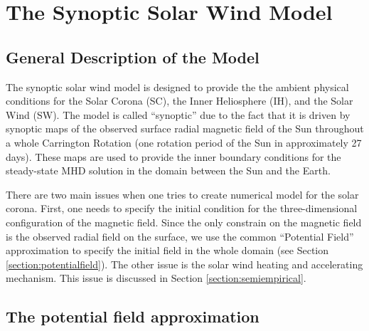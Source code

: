 \chapter{The Synoptic Solar Wind Model \label{chapter:synopticSW}}

\section{General Description of the Model \label{section:SWmodel}}
The synoptic solar wind model is designed to provide the the ambient physical 
conditions for the Solar Corona (SC), the Inner Heliosphere (IH), and the 
Solar Wind (SW). 
The model is called ``synoptic'' due to the fact that it is driven by synoptic 
maps of the observed surface radial magnetic field of the Sun throughout a 
whole Carrington Rotation (one rotation period of the Sun in approximately 27 
days). These maps are used to provide the inner boundary conditions for the 
steady-state MHD solution in the domain between the Sun and the Earth.

There are two main issues when one tries to create numerical model for the 
solar corona. First, one needs to specify the initial condition for the 
three-dimensional configuration of the magnetic field. Since the only 
constrain on the magnetic field is the observed radial field on the surface, 
we use the common ``Potential Field'' approximation to specify the initial 
field in the whole domain (see Section \ref{section:potentialfield}). The 
other issue is the solar wind heating and accelerating mechanism. This issue 
is discussed in Section \ref{section:semiempirical}.      


\section{The potential field approximation \label{section:potentialfield}}

